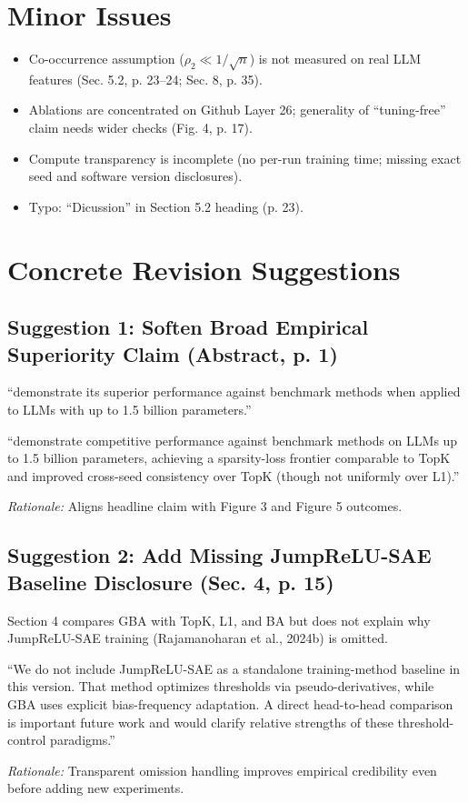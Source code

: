 \documentclass[11pt,a4paper]{article}
\begin{document}
\section{Minor Issues}
\begin{itemize}[leftmargin=*]
\item Co-occurrence assumption ($\rho_2 \ll 1/\sqrt{n}$) is not measured on real LLM features (Sec. 5.2, p. 23--24; Sec. 8, p. 35).
\item Ablations are concentrated on Github Layer 26; generality of ``tuning-free'' claim needs wider checks (Fig. 4, p. 17).
\item Compute transparency is incomplete (no per-run training time; missing exact seed and software version disclosures).
\item Typo: ``Dicussion'' in Section 5.2 heading (p. 23).
\end{itemize}

\section{Concrete Revision Suggestions}
\subsection*{Suggestion 1: Soften Broad Empirical Superiority Claim (Abstract, p. 1)}
\begin{originaltext}
``demonstrate its superior performance against benchmark methods when applied to LLMs with up to 1.5 billion parameters.''
\end{originaltext}
\begin{revisedtext}
``demonstrate competitive performance against benchmark methods on LLMs up to 1.5 billion parameters, achieving a sparsity-loss frontier comparable to TopK and improved cross-seed consistency over TopK (though not uniformly over L1).''
\end{revisedtext}
\textit{Rationale:} Aligns headline claim with Figure 3 and Figure 5 outcomes.

\subsection*{Suggestion 2: Add Missing JumpReLU-SAE Baseline Disclosure (Sec. 4, p. 15)}
\begin{originaltext}
Section 4 compares GBA with TopK, L1, and BA but does not explain why JumpReLU-SAE training (Rajamanoharan et al., 2024b) is omitted.
\end{originaltext}
\begin{revisedtext}
``We do not include JumpReLU-SAE as a standalone training-method baseline in this version. That method optimizes thresholds via pseudo-derivatives, while GBA uses explicit bias-frequency adaptation. A direct head-to-head comparison is important future work and would clarify relative strengths of these threshold-control paradigms.''
\end{revisedtext}
\textit{Rationale:} Transparent omission handling improves empirical credibility even before adding new experiments.
\end{document}
